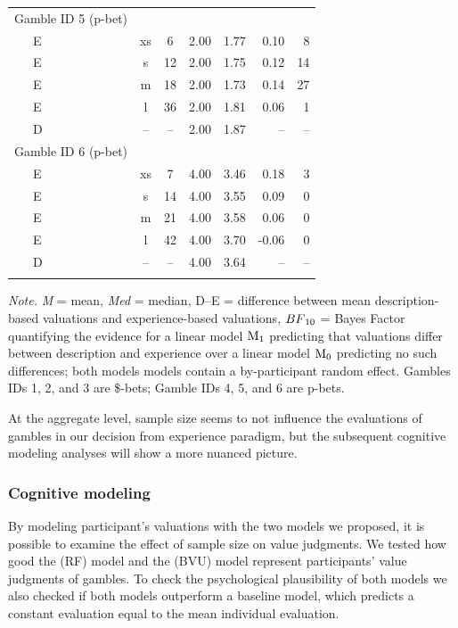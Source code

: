 \documentclass[a4paper, man, floatsintext]{apa6}
\begin{document}
\begin{table}[tbp]
\begin{center}
\begin{threeparttable}
\begin{tabular}{lccccrr}
Gamble ID 5 (p-bet) &  &  &  &  &  & \\
\ \ \ E & xs & 6 & 2.00 & 1.77 & 0.10 & 8\\
\ \ \ E & s & 12 & 2.00 & 1.75 & 0.12 & 14\\
\ \ \ E & m & 18 & 2.00 & 1.73 & 0.14 & 27\\
\ \ \ E & l & 36 & 2.00 & 1.81 & 0.06 & 1\\
\ \ \ D & -- & -- & 2.00 & 1.87 & -- & --\\
Gamble ID 6 (p-bet) &  &  &  &  &  & \\
\ \ \ E & xs & 7 & 4.00 & 3.46 & 0.18 & 3\\
\ \ \ E & s & 14 & 4.00 & 3.55 & 0.09 & 0\\
\ \ \ E & m & 21 & 4.00 & 3.58 & 0.06 & 0\\
\ \ \ E & l & 42 & 4.00 & 3.70 & -0.06 & 0\\
\ \ \ D & -- & -- & 4.00 & 3.64 & -- & --\\
\bottomrule
\addlinespace
\end{tabular}

\begin{tablenotes}[para]
\normalsize{\textit{Note.} \textit{M} = mean, \textit{Med} = median, D--E = difference between mean description-based valuations and experience-based valuations, $BF\textsubscript{10}$ = Bayes Factor quantifying the evidence for a linear model $\mathrm{M}\textsubscript{1}$ predicting that valuations differ between description and experience over a linear model $\mathrm{M}\textsubscript{0}$ predicting no such differences; both models models contain a by-participant random effect. Gambles IDs 1, 2, and 3 are \$-bets; Gamble IDs 4, 5, and 6 are p-bets.}
\end{tablenotes}

\end{threeparttable}
\end{center}

\end{table}

At the aggregate level, sample size seems to not influence the
evaluations of gambles in our decision from experience paradigm, but the
subsequent cognitive modeling analyses will show a more nuanced picture.

\subsubsection{Cognitive modeling}

By modeling participant's valuations with the two models we proposed, it
is possible to examine the effect of sample size on value judgments. We
tested how good the  (RF) model and the
 (BVU) model represent
participants' value judgments of gambles. To check the psychological
plausibility of both models we also checked if both models outperform a
baseline model, which predicts a constant evaluation equal to the mean
individual evaluation.
\end{document}
